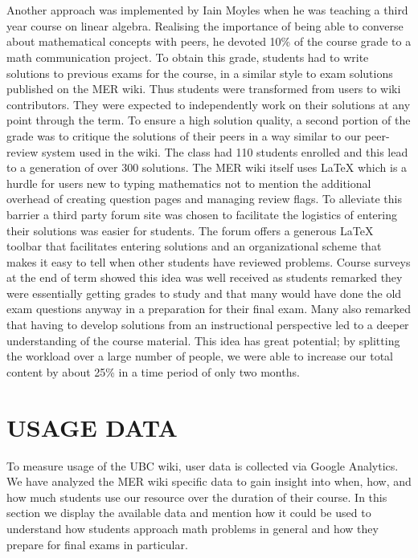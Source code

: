 \documentclass{primus}
\begin{document}
\\\\
\noindent{}Another approach was implemented by Iain Moyles when he was teaching a third year course on linear algebra.  Realising the importance of being able to converse about mathematical concepts with peers, he devoted 10\% of the course grade to a math communication project.  To obtain this grade, students had to write solutions to previous exams for the course, in a similar style to exam solutions published on the MER wiki. Thus students were transformed from users to wiki contributors.  They were expected to independently work on their solutions at any point through the term.  To ensure a high solution quality, a second portion of the grade was to critique the solutions of their peers in a way similar to our peer-review system used in the wiki.  The class had 110 students enrolled and this lead to a generation of over 300 solutions.  The MER wiki itself uses LaTeX which is a hurdle for users new to typing mathematics not to mention the additional overhead of creating question pages and managing review flags. To alleviate this barrier a third party forum site was chosen to facilitate the logistics of entering their solutions was easier for students. The forum offers a generous LaTeX toolbar that facilitates entering solutions and an organizational scheme that makes it easy to tell when other students have reviewed problems. Course surveys at the end of term showed this idea was well received as students remarked they were essentially getting grades to study and that many would have done the old exam questions anyway in a preparation for their final exam.  Many also remarked that having to develop solutions from an instructional perspective led to a deeper understanding of the course material.  This idea has great potential; by splitting the workload over a large number of people, we were able to increase our total content by about 25\% in a time period of only two months.

\section{USAGE DATA}\label{sec:Usage_Data}
To measure usage of the UBC wiki, user data is collected via Google Analytics. We have analyzed the MER wiki specific data to gain insight into when, how, and how much students use our resource over the duration of their course. In this section we display the available data and mention how it could be used to understand how students approach math problems in general and how they prepare for final exams in particular.
\end{document}
